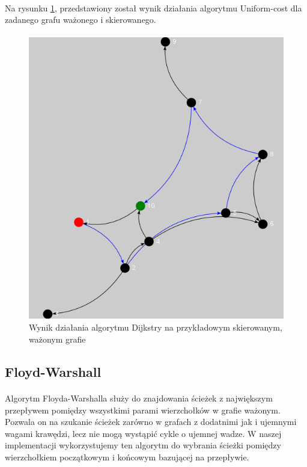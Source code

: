 \paragraph{}
Na rysunku \ref{fig:uniformCost}, przedstawiony został wynik działania algorytmu Uniform-cost dla zadanego grafu ważonego i skierowanego.

\paragraph{}
\begin{figure}[!h]
 \centering
 \includegraphics{algorithms/uniformCost}
 \caption{Wynik działania algorytmu Dijkstry na przykładowym skierowanym, ważonym grafie}
 \label{fig:uniformCost}
\end{figure}


\subsection{Floyd-Warshall}
\paragraph{}
Algorytm Floyda-Warshalla służy do znajdowania ścieżek z największym przepływem pomiędzy wszystkimi parami wierzchołków w grafie ważonym.
Pozwala on na szukanie ścieżek zarówno w grafach z dodatnimi jak i ujemnymi wagami krawędzi, lecz nie mogą wystąpić cykle o ujemnej wadze.
W naszej implementacji wykorzystujemy ten algorytm do wybrania ścieżki pomiędzy wierzchołkiem początkowym i końcowym bazującej na przepływie.

